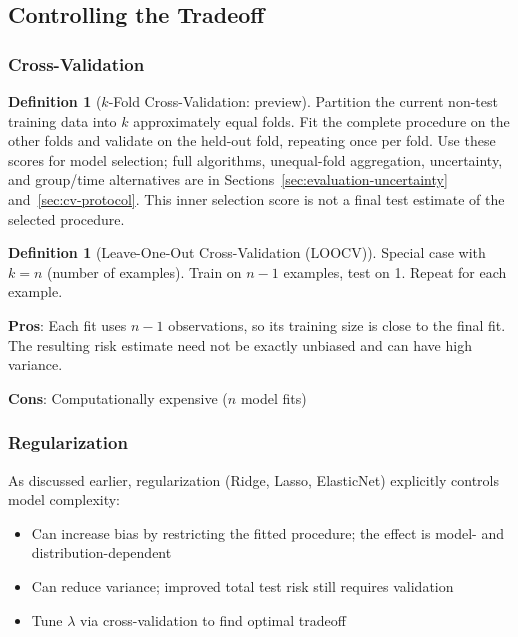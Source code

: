 \documentclass[11pt,twoside]{article}
\numberwithin{equation}{section}
\theoremstyle{plain}
\theoremstyle{definition}
\newtheorem{definition}[theorem]{Definition}
\theoremstyle{remark}
\begin{document}
\subsection{Controlling the Tradeoff}

\subsubsection{Cross-Validation}

\begin{definition}[$k$-Fold Cross-Validation: preview]
Partition the current non-test training data into $k$ approximately equal
folds. Fit the complete procedure on the other folds and validate on the
held-out fold, repeating once per fold. Use these scores for model selection;
full algorithms, unequal-fold aggregation, uncertainty, and group/time
alternatives are in Sections~\ref{sec:evaluation-uncertainty}
and~\ref{sec:cv-protocol}. This inner selection score is not a final test
estimate of the selected procedure.
\end{definition}

\begin{definition}[Leave-One-Out Cross-Validation (LOOCV)]
Special case with $k = n$ (number of examples). Train on $n-1$ examples, test on 1. Repeat for each example.

\textbf{Pros}: Each fit uses $n-1$ observations, so its training size is close to the final fit. The resulting risk estimate need not be exactly unbiased and can have high variance.

\textbf{Cons}: Computationally expensive ($n$ model fits)
\end{definition}

\subsubsection{Regularization}

As discussed earlier, regularization (Ridge, Lasso, ElasticNet) explicitly controls model complexity:
\begin{itemize}
\item Can increase bias by restricting the fitted procedure; the effect is model- and distribution-dependent
\item Can reduce variance; improved total test risk still requires validation
\item Tune $\lambda$ via cross-validation to find optimal tradeoff
\end{itemize}
\end{document}
